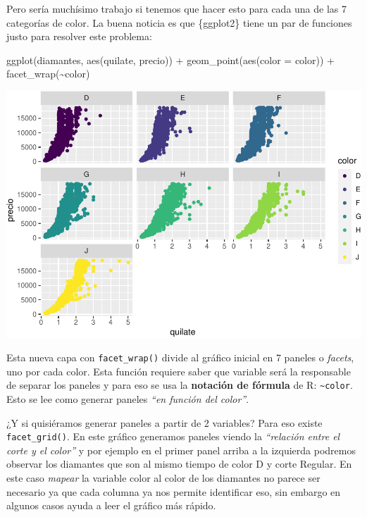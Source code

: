 \documentclass[
  openany]{book}
\newenvironment{Shaded}{\begin{snugshade}}{\end{snugshade}}
\newcommand{\AttributeTok}[1]{\textcolor[rgb]{0.77,0.63,0.00}{#1}}
\newcommand{\FunctionTok}[1]{\textcolor[rgb]{0.00,0.00,0.00}{#1}}
\newcommand{\NormalTok}[1]{#1}
\newcommand{\SpecialCharTok}[1]{\textcolor[rgb]{0.00,0.00,0.00}{#1}}
\begin{document}
Pero sería muchísimo trabajo si tenemos que hacer esto para cada una de las 7 categorías de color.
La buena noticia es que \{ggplot2\} tiene un par de funciones justo para resolver este problema:

\begin{Shaded}
\begin{Highlighting}[]
\FunctionTok{ggplot}\NormalTok{(diamantes, }\FunctionTok{aes}\NormalTok{(quilate, precio)) }\SpecialCharTok{+}
  \FunctionTok{geom\_point}\NormalTok{(}\FunctionTok{aes}\NormalTok{(}\AttributeTok{color =}\NormalTok{ color)) }\SpecialCharTok{+}
  \FunctionTok{facet\_wrap}\NormalTok{(}\SpecialCharTok{\textasciitilde{}}\NormalTok{color)}
\end{Highlighting}
\end{Shaded}

\begin{center}\includegraphics[width=1\linewidth]{DT6_files/figure-latex/unnamed-chunk-73-1} \end{center}

Esta nueva capa con \texttt{facet\_wrap()} divide al gráfico inicial en 7 paneles o \emph{facets}, uno por cada color.
Esta función requiere saber que variable será la responsable de separar los paneles y para eso se usa la \textbf{notación de fórmula} de R: \texttt{\textasciitilde{}color}.
Esto se lee como generar paneles \emph{``en función del color''}.

¿Y si quisiéramos generar paneles a partir de 2 variables?
Para eso existe \texttt{facet\_grid()}.
En este gráfico generamos paneles viendo la \emph{``relación entre el corte y el color''} y por ejemplo en el primer panel arriba a la izquierda podremos observar los diamantes que son al mismo tiempo de color D y corte Regular.
En este caso \emph{mapear} la variable color al color de los diamantes no parece ser necesario ya que cada columna ya nos permite identificar eso, sin embargo en algunos casos ayuda a leer el gráfico más rápido.
\end{document}
